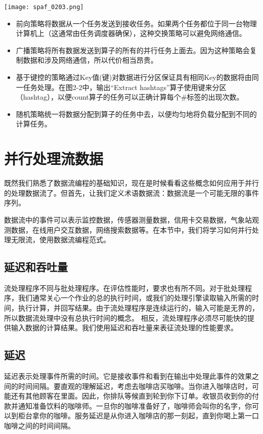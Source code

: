 \documentclass[oneside]{ctexbook}
\begin{document}
\noindent\texttt{[image: spaf\_0203.png]}

\begin{itemize}
  \item 前向策略将数据从一个任务发送到接收任务。如果两个任务都位于同一台物理计算机上（这通常由任务调度器确保），这种交换策略可以避免网络通信。
  \item 广播策略将所有数据发送到算子的所有的并行任务上面去。因为这种策略会复制数据和涉及网络通信，所以代价相当昂贵。
  \item 基于键控的策略通过Key值(键)对数据进行分区保证具有相同Key的数据将由同一任务处理。在图2-2中，输出“Extract hashtags”算子使用键来分区（hashtag），以便count算子的任务可以正确计算每个\#标签的出现次数。
  \item 随机策略统一将数据分配到算子的任务中去，以便均匀地将负载分配到不同的计算任务。
\end{itemize}

\section{并行处理流数据}

既然我们熟悉了数据流编程的基础知识，现在是时候看看这些概念如何应用于并行的处理数据流了。但首先，让我们定义术语数据流：数据流是一个可能无限的事件序列。

数据流中的事件可以表示监控数据，传感器测量数据，信用卡交易数据，气象站观测数据，在线用户交互数据，网络搜索数据等。在本节中，我们将学习如何并行处理无限流，使用数据流编程范式。

\subsection{延迟和吞吐量}

流处理程序不同与批处理程序。在评估性能时，要求也有所不同。对于批处理程序，我们通常关心一个作业的总的执行时间，或我们的处理引擎读取输入所需的时间，执行计算，并回写结果。由于流处理程序是连续运行的，输入可能是无界的，所以数据流处理中没有总执行时间的概念。
相反，流处理程序必须尽可能快的提供输入数据的计算结果。我们使用延迟和吞吐量来表征流处理的性能要求。

\subsection{延迟}

延迟表示处理事件所需的时间。它是接收事件和看到在输出中处理此事件的效果之间的时间间隔。要直观的理解延迟，考虑去咖啡店买咖啡。当你进入咖啡店时，可能还有其他顾客在里面。因此，你排队等候直到轮到你下订单。收银员收到你的付款并通知准备饮料的咖啡师。一旦你的咖啡准备好了，咖啡师会叫你的名字，你可以到柜台拿你的咖啡。服务延迟是从你进入咖啡店的那一刻起，直到你喝上第一口咖啡之间的时间间隔。
\end{document}
